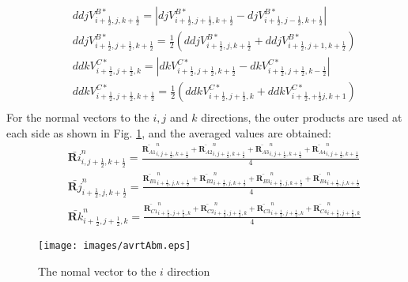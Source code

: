 \begin{enumerate}
\begin{eqnarray*}
		&&ddjV^{B*}_{i+\frac{1}{2},j,k+\frac{1}{2}}=\left|djV^{B*}_{i+\frac{1}{2},j+\frac{1}{2},k+\frac{1}{2}}-djV^{B*}_{i+\frac{1}{2},j-\frac{1}{2},k+\frac{1}{2}}\right|\\
		&&ddjV^{B*}_{i+\frac{1}{2},j+\frac{1}{2},k+\frac{1}{2}}=\frac{1}{2}\left(ddjV^{B*}_{i+\frac{1}{2},j,k+\frac{1}{2}}+ddjV^{B*}_{i+\frac{1}{2},j+1,k+\frac{1}{2}}\right)\\
		&&ddkV^{C*}_{i+\frac{1}{2},j+\frac{1}{2},k}=\left|dkV^{C*}_{i+\frac{1}{2},j+\frac{1}{2},k+\frac{1}{2}}-dkV^{C*}_{i+\frac{1}{2},j+\frac{1}{2},k-\frac{1}{2}}\right|\\
		&&ddkV^{C*}_{i+\frac{1}{2},j+\frac{1}{2},k+\frac{1}{2}}=\frac{1}{2}\left(ddkV^{C*}_{i+\frac{1}{2},j+\frac{1}{2},k}+ddkV^{C*}_{i+\frac{1}{2},+\frac{1}{2}j,k+1}\right)\\
	\end{eqnarray*}
\normalsize
For the normal vectors to the $ i, j$ and $k$ directions, the outer products are used at  each side as shown in Fig. \ref{fig:qAbm}, and the averaged values are obtained:  
\small
\begin{eqnarray*}\label{vector}
	&&\bar{\bm Ri}^n_{i,j+\frac{1}{2},k+\frac{1}{2}}=\frac{\bar{\bm R_{A1}}^n_{i,j+\frac{1}{2},k+\frac{1}{2}}+\bar{\bm R_{A2}}^n_{i,j+\frac{1}{2},k+\frac{1}{2}}+\bar{\bm R_{A3}}^n_{i,j+\frac{1}{2},k+\frac{1}{2}}+\bar{\bm R_{A4}}^n_{i,j+\frac{1}{2},k+\frac{1}{2}}}{4}\\	
	&&\bar{\bm Rj}^n_{i+\frac{1}{2},j,k+\frac{1}{2}}=\frac{\bar{\bm R_{B1}}^n_{i+\frac{1}{2},j,k+\frac{1}{2}}+\bar{\bm R_{B2}}^n_{i+\frac{1}{2},j,k+\frac{1}{2}}+\bar{\bm R_{B3}}^n_{i+\frac{1}{2},j,k+\frac{1}{2}}+\bar{\bm R_{B4}}^n_{i+\frac{1}{2},j,k+\frac{1}{2}}}{4}\\
	&&\bar{\bm Rk}^n_{i+\frac{1}{2},j+\frac{1}{2},k}=\frac{\bar{\bm R_{C1}}^n_{i+\frac{1}{2},j+\frac{1}{2},k}+\bar{\bm R_{C2}}^n_{i+\frac{1}{2},j+\frac{1}{2},k}+\bar{\bm R_{C3}}^n_{i+\frac{1}{2},j+\frac{1}{2},k}+\bar{\bm R_{C4}}^n_{i+\frac{1}{2},j+\frac{1}{2},k}}{4}
\end{eqnarray*}
\normalsize
\begin{figure}[H]
	\centering
	\texttt{[image: images/avrtAbm.eps]}
	\caption{The nomal vector to the $i$ direction}\label{fig:qAbm}
\end{figure}





\end{enumerate}
